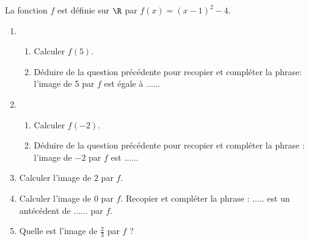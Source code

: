 
La fonction $f$ est définie sur $\R$ par $f(x)=(x-1)^2-4$.
\begin{enumerate}
\item
\begin{enumerate}
\item Calculer $f(5)$.
\item Déduire de la question précédente pour recopier et compléter la phrase:  l'image de 5 par $f$ est égale à ......
\end{enumerate}
\item
\begin{enumerate}
\item Calculer $f(-2)$.
\item Déduire de la question précédente pour recopier et compléter la phrase : l'image de $-2$ par $f$ est ......
\end{enumerate}
\item Calculer l'image de $2$ par $f$. 
\item Calculer l'image de $0$ par $f$. Recopier et compléter la phrase : ..... est un antécédent de ...... par $f$.
\item Quelle est l'image de $\frac{2}{3}$ par $f$ ?
\end{enumerate}


 